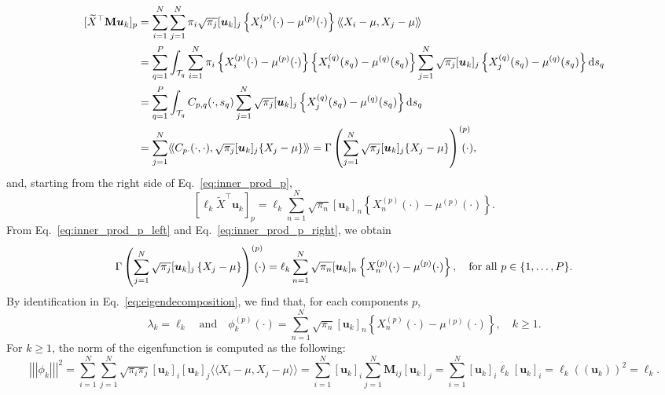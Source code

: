 \documentclass[times,sort&compress,3p]{elsarticle}
\theoremstyle{plain}%
\theoremstyle{definition}
\newcommand{\dd}{{\rm d}}
\newcommand{\TT}[1]{\mathcal{T}_{#1}} %
\newcommand{\normR}[1]{\left(\!\left(#1\right)\!\right)} %
\newcommand{\inH}[2]{\langle\!\langle#1, #2\rangle\!\rangle}
\newcommand{\normH}[1]{\left|\left|\left|#1\right|\right|\right|}
\newcommand{\Xnp}{X_n^{(p)}} %
\begin{document}
\begin{align}\label{eq:inner_prod_p_left}
[\widetilde{X}^\top \mathbf{M} \boldsymbol{u}_k]_p
  &= \sum_{i = 1}^N \sum_{j = 1}^N \pi_i \sqrt{\pi_j} [\boldsymbol{u}_{k}]_j \left\{X_i^{(p)}(\cdot) - \mu^{(p)}(\cdot)\right\}\inH{X_i - \mu}{X_j - \mu}\\
  &= \sum_{q = 1}^P \int_{\TT{q}} \sum_{i = 1}^N \pi_i\left\{X_i^{(p)}(\cdot) - \mu^{(p)}(\cdot)\right\} \left\{X_i^{(q)}(s_q) - \mu^{(q)}(s_q)\right\} \sum_{j = 1}^N \sqrt{\pi_j}[\boldsymbol{u}_{k}]_j \left\{X_j^{(q)}(s_q) - \mu^{(q)}(s_q)\right\} \dd s_q \\
  &= \sum_{q = 1}^P \int_{\TT{q}} C_{p,q}(\cdot, s_q)\sum_{j = 1}^N \sqrt{\pi_j}[\boldsymbol{u}_{k}]_j \left\{X_j^{(q)}(s_q) - \mu^{(q)}(s_q)\right\} \dd s_q \\
  &= \sum_{j = 1}^N \inH{C_{p \cdot}(\cdot, \cdot)}{\sqrt{\pi_j}[\boldsymbol{u}_{k}]_j \{X_j - \mu\}}
  = \Gamma\left(\sum_{j = 1}^N \sqrt{\pi_j}[\boldsymbol{u}_{k}]_j \{X_j - \mu\} \right)^{(p)}\mkern-18mu(\cdot),
\end{align}
and, starting from the right side of Eq.~\eqref{eq:inner_prod_p},
\begin{equation}\label{eq:inner_prod_p_right}
    [\ell_k \widetilde{X}^\top \boldsymbol{u}_k]_p = \ell_k \sum_{n = 1}^N \sqrt{\pi_n}[\boldsymbol{u}_{k}]_n \left\{\Xnp(\cdot) - \mu^{(p)}(\cdot)\right\}.
\end{equation}
From Eq.~\eqref{eq:inner_prod_p_left} and Eq.~\eqref{eq:inner_prod_p_right}, we obtain
\begin{equation}
    \Gamma\left(\sum_{j = 1}^N \sqrt{\pi_j}[\boldsymbol{u}_{k}]_j \left\{X_j - \mu\right\}\right)^{(p)}\mkern-18mu(\cdot) = \ell_k \sum_{n = 1}^N \sqrt{\pi_n}[\boldsymbol{u}_{k}]_n \left\{\Xnp(\cdot) - \mu^{(p)}(\cdot)\right\}, \quad\text{for all}~ p \in \{1, \dots, P\}.
\end{equation}
By identification in Eq.~\eqref{eq:eigendecomposition}, we find that, for each components $p$,
\begin{equation}\label{eq:eigen_estimation}
\lambda_k = \ell_k \quad\text{and}\quad \phi_k^{(p)}(\cdot) = \sum_{n = 1}^N \sqrt{\pi_n}[\boldsymbol{u}_{k}]_n \left\{\Xnp(\cdot) - \mu^{(p)}(\cdot)\right\}, \quad k \geq 1.
\end{equation}
For $k \geq 1$, the norm of the eigenfunction is computed as the following:
\begin{equation*}
\normH{\phi_k}^2 = \sum_{i = 1}^N \sum_{j = 1}^N \sqrt{\pi_i\pi_j}[\boldsymbol{u}_{k}]_i [\boldsymbol{u}_{k}]_j\inH{X_i - \mu}{X_j - \mu} = \sum_{i = 1}^N [\boldsymbol{u}_{k}]_i \sum_{j = 1}^N \mathbf{M}_{ij} [\boldsymbol{u}_{k}]_j 
    = \sum_{i = 1}^N [\boldsymbol{u}_{k}]_i \ell_k [\boldsymbol{u}_{k}]_i = \ell_k \normR{\boldsymbol{u}_k}^2 = \ell_k. 
\end{equation*}
\end{document}
